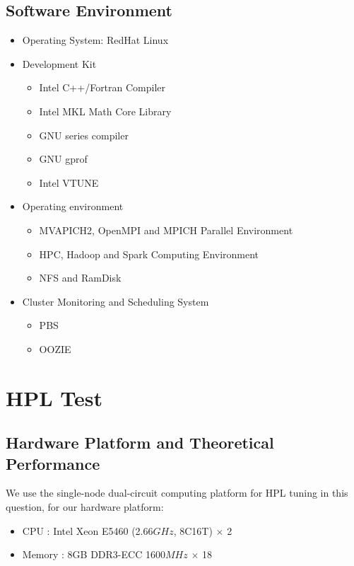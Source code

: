 \documentclass{mcmthesis}
\begin{document}
\subsection{Software Environment}


\begin{itemize}
	\item Operating System: RedHat Linux
	\item Development Kit
	\begin{itemize}
		\item Intel C++/Fortran Compiler
		\item Intel MKL Math Core Library
		\item GNU series compiler
		\item GNU gprof
		\item Intel VTUNE
	\end{itemize}
	\item Operating environment
	\begin{itemize}
		\item MVAPICH2, OpenMPI and MPICH Parallel Environment
		\item HPC, Hadoop and Spark Computing Environment
		\item NFS and RamDisk 
	\end{itemize}
	\item Cluster Monitoring and Scheduling System 
	\begin{itemize}
		\item PBS
		\item OOZIE
	\end{itemize}
\end{itemize}



\section{HPL Test}


\subsection{Hardware Platform and Theoretical Performance}

We use the single-node dual-circuit computing platform for HPL tuning in this question, for our hardware platform:

\begin{itemize}
	\item CPU : Intel Xeon E5460 (2.66$GHz$, 8C16T)  $\times$ 2 
	\item Memory : 8GB DDR3-ECC 1600$MHz$ $\times$ 18
\end{itemize}
\end{document}
